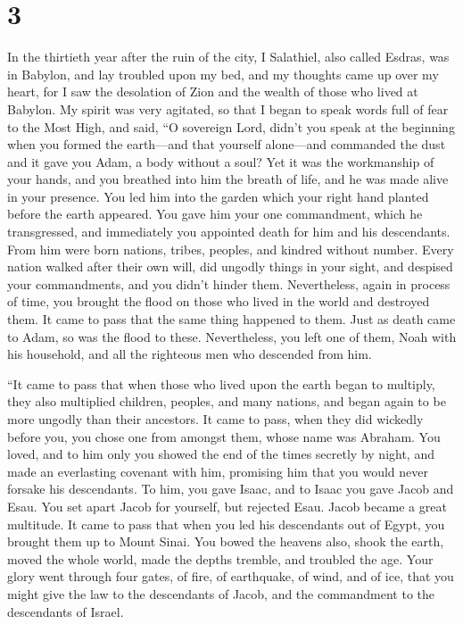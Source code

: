 \hypertarget{section-2}{%
\section{3}\label{section-2}}

 In the thirtieth year after the ruin of the city, I
Salathiel, also called Esdras, was in Babylon, and lay troubled upon my
bed, and my thoughts came up over my heart,  for I saw the
desolation of Zion and the wealth of those who lived at Babylon.
 My spirit was very agitated, so that I began to speak words
full of fear to the Most High, and said,  ``O sovereign
Lord, didn't you speak at the beginning when you formed the earth---and
that yourself alone---and commanded the dust  and it gave
you Adam, a body without a soul? Yet it was the workmanship of your
hands, and you breathed into him the breath of life, and he was made
alive in your presence.  You led him into the garden which
your right hand planted before the earth appeared.  You gave
him your one commandment, which he transgressed, and immediately you
appointed death for him and his descendants. From him were born nations,
tribes, peoples, and kindred without number.  Every nation
walked after their own will, did ungodly things in your sight, and
despised your commandments, and you didn't hinder them. 
Nevertheless, again in process of time, you brought the flood on those
who lived in the world and destroyed them.  It came to pass
that the same thing happened to them. Just as death came to Adam, so was
the flood to these.  Nevertheless, you left one of them,
Noah with his household, and all the righteous men who descended from
him.

 ``It came to pass that when those who lived upon the earth
began to multiply, they also multiplied children, peoples, and many
nations, and began again to be more ungodly than their ancestors.
 It came to pass, when they did wickedly before you, you
chose one from amongst them, whose name was Abraham.  You
loved, and to him only you showed the end of the times secretly by
night,  and made an everlasting covenant with him,
promising him that you would never forsake his descendants. To him, you
gave Isaac, and to Isaac you gave Jacob and Esau.  You set
apart Jacob for yourself, but rejected Esau. Jacob became a great
multitude.  It came to pass that when you led his
descendants out of Egypt, you brought them up to Mount Sinai.
 You bowed the heavens also, shook the earth, moved the
whole world, made the depths tremble, and troubled the age.
 Your glory went through four gates, of fire, of
earthquake, of wind, and of ice, that you might give the law to the
descendants of Jacob, and the commandment to the descendants of Israel.

